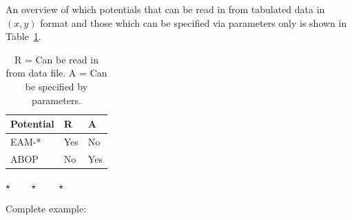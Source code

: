 \documentclass[a4paper,12pt,pdftex,onecolumn]{article}
\newcommand{\stars}{\begin{center}%
\vspace{1em plus 0.5em minus 0.5em}%
$\star \qquad \star \qquad \star$%
\vspace{1em plus 0.5em minus 0.5em}%
\end{center}}
\begin{document}
An overview of which potentials that can be read in from tabulated data
in $(x, y)$ format and those which can be specified via parameters only
is shown in Table~\ref{tab:pot-da}.


\begin{table}[!h]
\caption{
R = Can be read in from data file.
A = Can be specified by parameters.
\label{tab:pot-da}
}
\begin{center}
\begin{tabular}{|l|l|l|}
\hline
\hline
Potential   & R    & A  \\
\hline
EAM-*       & Yes  & No \\
ABOP        & No   & Yes \\
\hline
\hline
\end{tabular}
\end{center}
\end{table}

\stars


Complete example:
\end{document}
